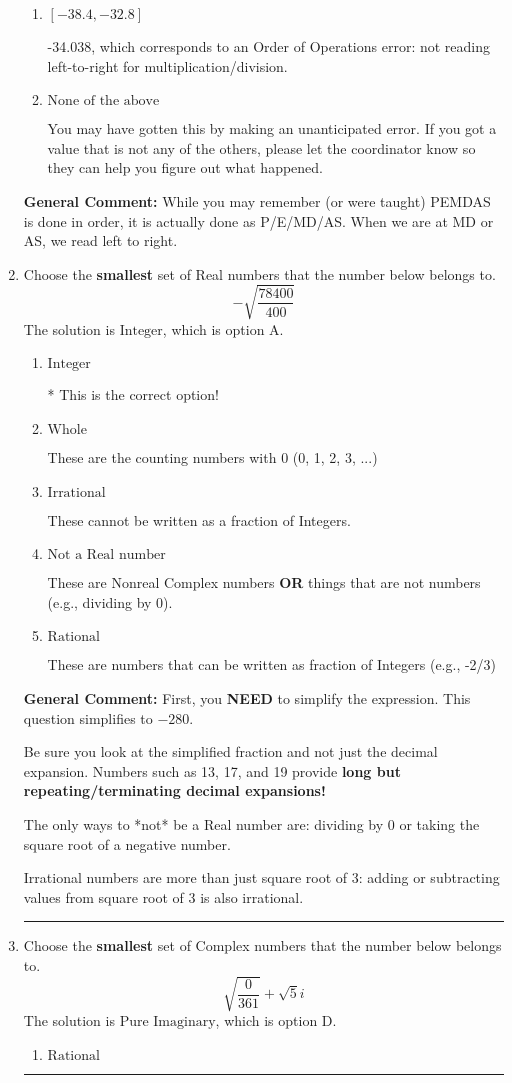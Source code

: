 \documentclass{extbook}[14pt]
\newcommand{\litem}[1]{\item #1

\rule{\textwidth}{0.4pt}}
\begin{document}
\begin{enumerate}
{\begin{enumerate}[label=\Alph*.]
* -40.500, which is the correct option.
\item \( [-38.4, -32.8] \)

 -34.038, which corresponds to an Order of Operations error: not reading left-to-right for multiplication/division.
\item \( \text{None of the above} \)

 You may have gotten this by making an unanticipated error. If you got a value that is not any of the others, please let the coordinator know so they can help you figure out what happened.
\end{enumerate}

\textbf{General Comment:} While you may remember (or were taught) PEMDAS is done in order, it is actually done as P/E/MD/AS. When we are at MD or AS, we read left to right.
}
\litem{
Choose the \textbf{smallest} set of Real numbers that the number below belongs to.
\[ -\sqrt{\frac{78400}{400}} \]The solution is \( \text{Integer} \), which is option A.\begin{enumerate}[label=\Alph*.]
\item \( \text{Integer} \)

* This is the correct option!
\item \( \text{Whole} \)

These are the counting numbers with 0 (0, 1, 2, 3, ...)
\item \( \text{Irrational} \)

These cannot be written as a fraction of Integers.
\item \( \text{Not a Real number} \)

These are Nonreal Complex numbers \textbf{OR} things that are not numbers (e.g., dividing by 0).
\item \( \text{Rational} \)

These are numbers that can be written as fraction of Integers (e.g., -2/3)
\end{enumerate}

\textbf{General Comment:} First, you \textbf{NEED} to simplify the expression. This question simplifies to $-280$. 
 
 Be sure you look at the simplified fraction and not just the decimal expansion. Numbers such as 13, 17, and 19 provide \textbf{long but repeating/terminating decimal expansions!} 
 
 The only ways to *not* be a Real number are: dividing by 0 or taking the square root of a negative number. 
 
 Irrational numbers are more than just square root of 3: adding or subtracting values from square root of 3 is also irrational.
}
\litem{
Choose the \textbf{smallest} set of Complex numbers that the number below belongs to.
\[ \sqrt{\frac{0}{361}}+\sqrt{5}i \]The solution is \( \text{Pure Imaginary} \), which is option D.\begin{enumerate}[label=\Alph*.]
\item \( \text{Rational} \)


\end{enumerate}}
\end{enumerate}
\end{document}
